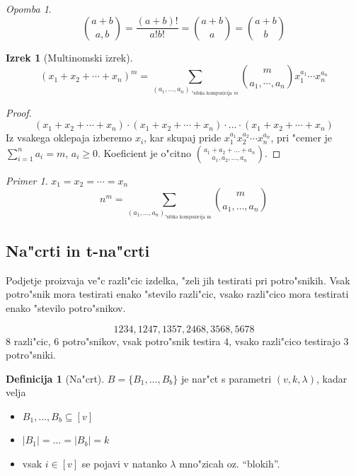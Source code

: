 \documentclass[a4paper,12pt]{article}
\theoremstyle{definition}
\newtheorem{defn}[counter]{Definicija}
\newtheorem{theorem}[counter]{Izrek}
\theoremstyle{remark}
\newtheorem*{ex}{Primer}
\newtheorem*{rem}{Opomba}
\begin{document}
\begin{rem}
	\[\binom{a+b}{a, b} = \frac{(a+b)!}{a!b!} = \binom{a+b}{a} = \binom{a+b}{b}\]
\end{rem}

\begin{theorem}[Multinomski izrek]
	\[(x_1 + x_2 + \cdots + x_n)^m = \sum_{(a_1, \ldots, a_n)_{\text{ "sibka kompozicija }m}} \binom{m}{a_1, \cdots, a_n} x_1^{a_1}\cdots x_n^{a_n}\]
\end{theorem}

\begin{proof}
	\[(x_1 + x_2 + \cdots + x_n)\cdot(x_1 + x_2 + \cdots + x_n)\cdot\ldots\cdot(x_1 + x_2 + \cdots + x_n)\]
	Iz vsakega oklepaja izberemo $x_i$, kar skupaj pride $x_1^{a_1} x_2^{a_2}\cdots x_n^{a_n}$, pri "cemer je $\displaystyle \sum_{i = 1}^n a_i = m$, $a_i \geqslant 0$. Koeficient je o"citno $\binom{a_1 + a_2 + \ldots + a_n}{a_1, a_2, \ldots, a_n}$.
\end{proof}

\begin{ex}
	$x_1 = x_2 = \cdots = x_n$
	\[n^m = \sum_{(a_1, \ldots, a_n)_{\text{"sibka kompozicija m}}} \binom{m}{a_1, \ldots, a_n}\]
\end{ex}


\subsection{Na"crti in t-na"crti}
Podjetje proizvaja ve"c razli"cic izdelka, "zeli jih testirati pri potro"snikih. Vsak potro"snik mora testirati enako "stevilo razli"cic, vsako razli"cico mora testirati enako "stevilo potro"snikov.

\[1234, 1247, 1357, 2468, 3568, 5678\]
$8$ razli"cic, $6$ potro"snikov, vsak potro"snik testira $4$, vsako razli"cico testirajo $3$ potro"sniki.

\begin{defn}[Na"crt]
	$B = \{B_1, \ldots, B_b\}$ je nar"ct s parametri $(v, k, \lambda)$, kadar velja
	\begin{itemize}
		\item $B_1, \ldots, B_b \subseteq [v]$
		\item $|B_1| = \ldots = |B_b| = k$
		\item vsak $i \in [v]$ se pojavi v natanko $\lambda$ mno"zicah oz. ``blokih''.
	\end{itemize}
\end{defn}
\end{document}
